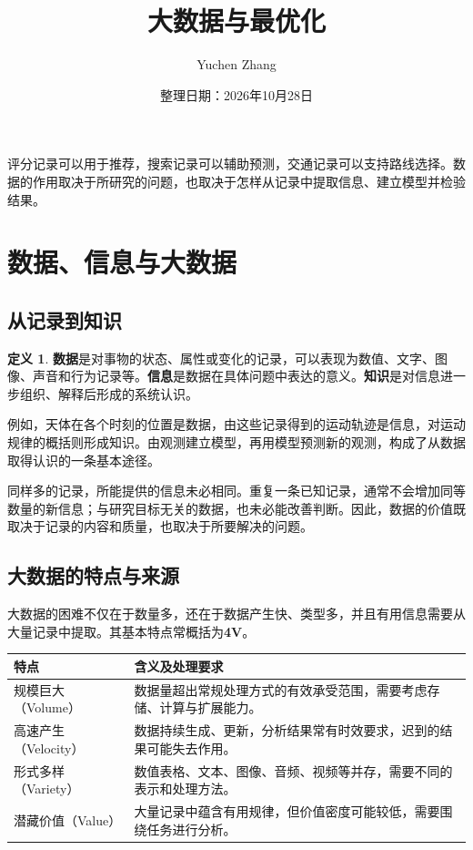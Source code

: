 \documentclass[UTF8,fontset=fandol,a4paper,12pt]{ctexart}
\title{大数据与最优化}
\author{Yuchen Zhang}
\date{整理日期：2026年10月28日}
\makeatletter
\theoremstyle{definition}
\newtheorem{definition}{定义}[section]
\renewcommand{\maketitle}{\begin{center}
{\LARGE\bfseries\@title\par}\vspace{0.6em}
\@author\par\vspace{0.2em}{\small\@date\par}
\end{center}}
\makeatother
\begin{document}
\maketitle
评分记录可以用于推荐，搜索记录可以辅助预测，交通记录可以支持路线选择。数据的作用取决于所研究的问题，也取决于怎样从记录中提取信息、建立模型并检验结果。
\tableofcontents
\newpage

\section{数据、信息与大数据}
\subsection{从记录到知识}
\begin{definition}
\textbf{数据}是对事物的状态、属性或变化的记录，可以表现为数值、文字、图像、声音和行为记录等。\textbf{信息}是数据在具体问题中表达的意义。\textbf{知识}是对信息进一步组织、解释后形成的系统认识。
\end{definition}

例如，天体在各个时刻的位置是数据，由这些记录得到的运动轨迹是信息，对运动规律的概括则形成知识。由观测建立模型，再用模型预测新的观测，构成了从数据取得认识的一条基本途径。

同样多的记录，所能提供的信息未必相同。重复一条已知记录，通常不会增加同等数量的新信息；与研究目标无关的数据，也未必能改善判断。因此，数据的价值既取决于记录的内容和质量，也取决于所要解决的问题。

\subsection{大数据的特点与来源}
大数据的困难不仅在于数量多，还在于数据产生快、类型多，并且有用信息需要从大量记录中提取。其基本特点常概括为\textbf{4V}。
\begin{center}
\begin{tabular}{p{}p{}}
\toprule
特点 & 含义及处理要求\\
\midrule
规模巨大（Volume） & 数据量超出常规处理方式的有效承受范围，需要考虑存储、计算与扩展能力。\\
高速产生（Velocity） & 数据持续生成、更新，分析结果常有时效要求，迟到的结果可能失去作用。\\
形式多样（Variety） & 数值表格、文本、图像、音频、视频等并存，需要不同的表示和处理方法。\\
潜藏价值（Value） & 大量记录中蕴含有用规律，但价值密度可能较低，需要围绕任务进行分析。\\
\bottomrule
\end{tabular}
\end{center}
\end{document}
